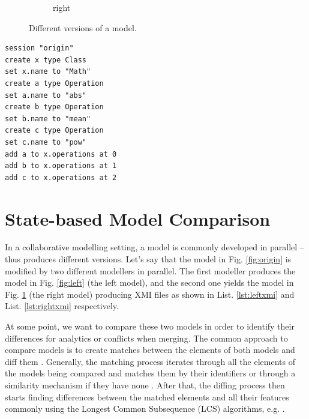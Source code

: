 \documentclass{llncs}
\begin{document}
\begin{minipage}[t]{0.59\linewidth}
\begin{figure}[H]
\begin{subfigure}[t]{0.2\linewidth}
    \caption{right}
    \label{fig:right}
\end{subfigure}
\hfill
\label{fig:versions}
\caption{Different versions of a model.}
\end{figure}
\end{minipage}
\hfill
\begin{minipage}[t]{0.39\linewidth}
\begin{lstlisting}[style=eol,caption={The pseudo-formatted CBP of the model in Fig. \ref{fig:origin}.},label=lst:origincbp]
session "origin"
create x type Class
set x.name to "Math" 
create a type Operation
set a.name to "abs" 
create b type Operation
set b.name to "mean" 
create c type Operation
set c.name to "pow" 
add a to x.operations at 0
add b to x.operations at 1
add c to x.operations at 2
\end{lstlisting}
\end{minipage}

\vspace{-5pt}
\section{State-based Model Comparison}
\label{sec:model_comparison}

\vspace{-5pt}
In a collaborative modelling setting, a model is commonly developed in parallel -- thus produces different versions. Let's say that the model in Fig. \ref{fig:origin} is modified by two different modellers in parallel. The first modeller produces the model in Fig. \ref{fig:left} (the left model), and the second one yields the model in Fig. \ref{fig:right} (the right model) producing XMI files as shown in List. \ref{lst:leftxmi} and List. \ref{lst:rightxmi} respectively.

At some point, we want to compare these two models in order to identify their differences for analytics or conflicts when merging. The common approach to compare models is to create matches between the elements of both models and diff them \cite{DBLP:conf/sfm/BroschKLSWW12,emfcompare2018developer}. Generally, the matching process iterates through all the elements of the models being compared and matches them by their identifiers or through a similarity mechanism if they have none \cite{DBLP:conf/sfm/BroschKLSWW12,emfcompare2018developer}. After that, the diffing process then starts finding differences between the matched elements and all their features commonly using the Longest Common Subsequence (LCS) algorithms, e.g. \cite{DBLP:journals/algorithmica/Meyers86}. 
\end{document}
